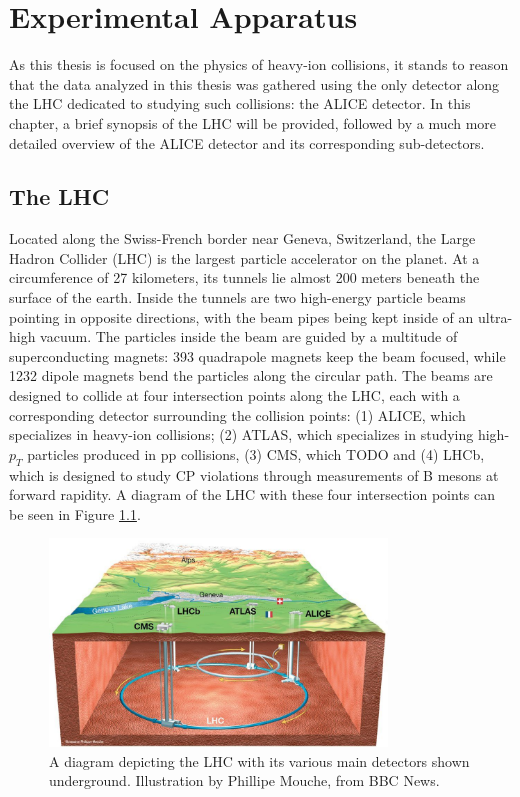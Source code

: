 \chapter{Experimental Apparatus}
As this thesis is focused on the physics of heavy-ion collisions, it stands to reason that the data analyzed in this thesis was gathered using the only detector along the LHC dedicated to studying such collisions: the ALICE detector.
In this chapter, a brief synopsis of the LHC will be provided, followed by a much more detailed overview of the ALICE detector and its corresponding sub-detectors. 

\section{The LHC}
Located along the Swiss-French border near Geneva, Switzerland, the Large Hadron Collider (LHC) is the largest particle accelerator on the planet.
At a circumference of 27 kilometers, its tunnels lie almost 200 meters beneath the surface of the earth.
Inside the tunnels are two high-energy particle beams pointing in opposite directions, with the beam pipes being kept inside of an ultra-high vacuum.
The particles inside the beam are guided by a multitude of superconducting magnets: 393 quadrapole magnets keep the beam focused, while 1232 dipole magnets bend the particles along the circular path. 
The beams are designed to collide at four intersection points along the LHC, each with a corresponding detector surrounding the collision points: (1) ALICE, which specializes in heavy-ion collisions; (2) ATLAS, which specializes in studying high-$p_{T}$ particles produced in pp collisions, (3) CMS, which TODO and (4) LHCb, which is designed to study CP violations through measurements of B mesons at forward rapidity. 
A diagram of the LHC with these four intersection points can be seen in Figure \ref{fig:lhcring}.
\begin{figure}
    \centering
    \includegraphics[width=0.8\textwidth]{figures/experiment/lhcring_illustration.jpeg}
    \caption{A diagram depicting the LHC with its various main detectors shown underground. Illustration by Phillipe Mouche, from BBC News.}
    \label{fig:lhcring}
\end{figure}

